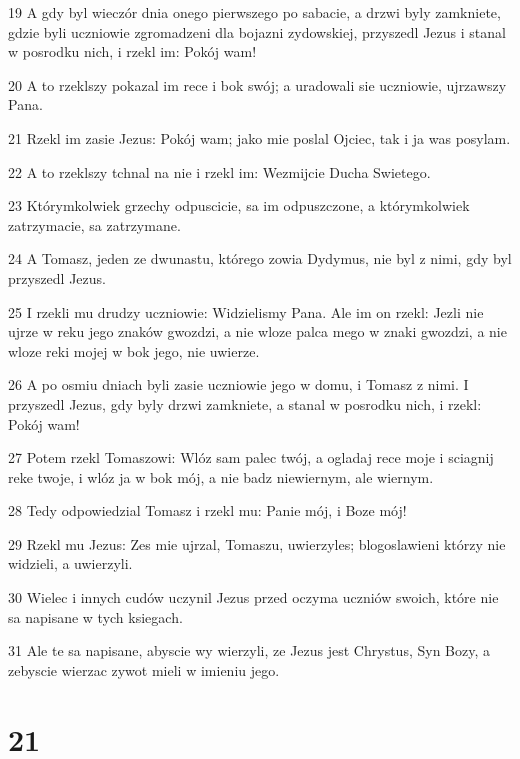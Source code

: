 \par 19 A gdy byl wieczór dnia onego pierwszego po sabacie, a drzwi byly zamkniete, gdzie byli uczniowie zgromadzeni dla bojazni zydowskiej, przyszedl Jezus i stanal w posrodku nich, i rzekl im: Pokój wam!
\par 20 A to rzeklszy pokazal im rece i bok swój; a uradowali sie uczniowie, ujrzawszy Pana.
\par 21 Rzekl im zasie Jezus: Pokój wam; jako mie poslal Ojciec, tak i ja was posylam.
\par 22 A to rzeklszy tchnal na nie i rzekl im: Wezmijcie Ducha Swietego.
\par 23 Którymkolwiek grzechy odpuscicie, sa im odpuszczone, a którymkolwiek zatrzymacie, sa zatrzymane.
\par 24 A Tomasz, jeden ze dwunastu, którego zowia Dydymus, nie byl z nimi, gdy byl przyszedl Jezus.
\par 25 I rzekli mu drudzy uczniowie: Widzielismy Pana. Ale im on rzekl: Jezli nie ujrze w reku jego znaków gwozdzi, a nie wloze palca mego w znaki gwozdzi, a nie wloze reki mojej w bok jego, nie uwierze.
\par 26 A po osmiu dniach byli zasie uczniowie jego w domu, i Tomasz z nimi. I przyszedl Jezus, gdy byly drzwi zamkniete, a stanal w posrodku nich, i rzekl: Pokój wam!
\par 27 Potem rzekl Tomaszowi: Wlóz sam palec twój, a ogladaj rece moje i sciagnij reke twoje, i wlóz ja w bok mój, a nie badz niewiernym, ale wiernym.
\par 28 Tedy odpowiedzial Tomasz i rzekl mu: Panie mój, i Boze mój!
\par 29 Rzekl mu Jezus: Zes mie ujrzal, Tomaszu, uwierzyles; blogoslawieni którzy nie widzieli, a uwierzyli.
\par 30 Wielec i innych cudów uczynil Jezus przed oczyma uczniów swoich, które nie sa napisane w tych ksiegach.
\par 31 Ale te sa napisane, abyscie wy wierzyli, ze Jezus jest Chrystus, Syn Bozy, a zebyscie wierzac zywot mieli w imieniu jego.

\chapter{21}

